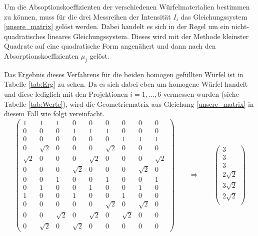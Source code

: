 Um die Absoptionskoeffizienten der verschiedenen Würfelmaterialien bestimmen zu können, muss für die drei Messreihen der Intensität $I_i$
das Gleichungssystem \ref{unsere_matrix} gelöst werden.
Dabei handelt es sich in der Regel um ein nicht-quadratisches lineares Gleichungssystem.
Dieses wird mit der Methode kleinster Quadrate auf eine quadratische Form angenähert und dann nach den Absorptionskoeffizienten $\mu_j$ gelöst.

Das Ergebnis dieses Verfahrens für die beiden homogen gefüllten Würfel ist in Tabelle \ref{tab:Erg} zu sehen.
Da es sich dabei eben um homogene Würfel handelt und diese lediglich mit den Projektionen $i=1,...,6$ vermessen wurden (siehe Tabelle \ref{tab:Werte}),
wird die Geometriematrix aus Gleichung \ref{unsere_matrix} in diesem Fall wie folgt vereinfacht.
\begin{equation}
    \begin{pmatrix}
        1 & 1 & 1 & 0 & 0 & 0 & 0 & 0 & 0 \\
        0 & 0 & 0 & 1 & 1 & 1 & 0 & 0 & 0 \\
        0 & 0 & 0 & 0 & 0 & 0 & 1 & 1 & 1 \\
        0 & \sqrt{2} & 0 & 0 & 0 & \sqrt{2} & 0 & 0 & 0 \\
        \sqrt{2} & 0 & 0 & 0 & \sqrt{2} & 0 & 0 & 0 & \sqrt{2} \\
        0 & 0 & 0 & \sqrt{2} & 0 & 0 & 0 & \sqrt{2} & 0 \\
        0 & 0 & 1 & 0 & 0 & 1 & 0 & 0 & 1 \\
        0 & 1 & 0 & 0 & 1 & 0 & 0 & 1 & 0 \\
        1 & 0 & 0 & 1 & 0 & 0 & 1 & 0 & 0 \\
        0 & 0 & 0 & 0 & 0 & \sqrt{2} & 0 & \sqrt{2} & 0 \\
        0 & 0 & \sqrt{2} & 0 & \sqrt{2} & 0 & \sqrt{2} & 0 & 0 \\
        0 & \sqrt{2} & 0 & \sqrt{2} & 0 & 0 & 0 & 0 & 0 
      \end{pmatrix}
      \qquad \Longrightarrow \qquad
      \begin{pmatrix}
        3 \\
        3 \\
        3 \\
        2\sqrt{2} \\
        3\sqrt{2} \\
        2\sqrt{2} \\
      \end{pmatrix}
\end{equation}
